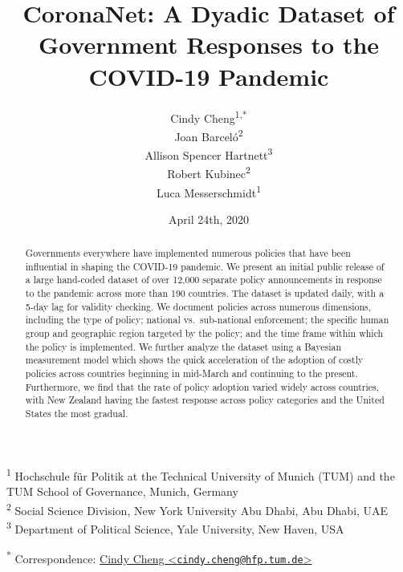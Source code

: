 \documentclass[]{article}
\title{CoronaNet: A Dyadic Dataset of Government Responses to the COVID-19 Pandemic}
\author{Cindy Cheng\textsuperscript{1,*} \\ Joan Barceló\textsuperscript{2} \\ Allison Spencer Hartnett\textsuperscript{3} \\ Robert Kubinec\textsuperscript{2} \\ Luca Messerschmidt\textsuperscript{1}}
\date{April 24th, 2020}
\begin{document}
\maketitle
\begin{abstract}
Governments everywhere have implemented numerous policies that have been influential in shaping the COVID-19 pandemic. We present an initial public release of a large hand-coded dataset of over 12,000 separate policy announcements in response to the pandemic across more than 190 countries. The dataset is updated daily, with a 5-day lag for validity checking. We document policies across numerous dimensions, including the type of policy; national vs.~sub-national enforcement; the specific human group and geographic region targeted by the policy; and the time frame within which the policy is implemented. We further analyze the dataset using a Bayesian measurement model which shows the quick acceleration of the adoption of costly policies across countries beginning in mid-March and continuing to the present. Furthermore, we find that the rate of policy adoption varied widely across countries, with New Zealand having the fastest response across policy categories and the United States the most gradual.
\end{abstract}

\textsuperscript{1} Hochschule für Politik at the Technical University of Munich (TUM) and the TUM School of Governance, Munich, Germany\\
\textsuperscript{2} Social Science Division, New York University Abu Dhabi, Abu Dhabi, UAE\\
\textsuperscript{3} Department of Political Science, Yale University, New Haven, USA

\textsuperscript{*} Correspondence: \href{mailto:cindy.cheng@hfp.tum.de}{Cindy Cheng \textless{}\href{mailto:cindy.cheng@hfp.tum.de}{\nolinkurl{cindy.cheng@hfp.tum.de}}\textgreater{}}

\newpage
\end{document}

